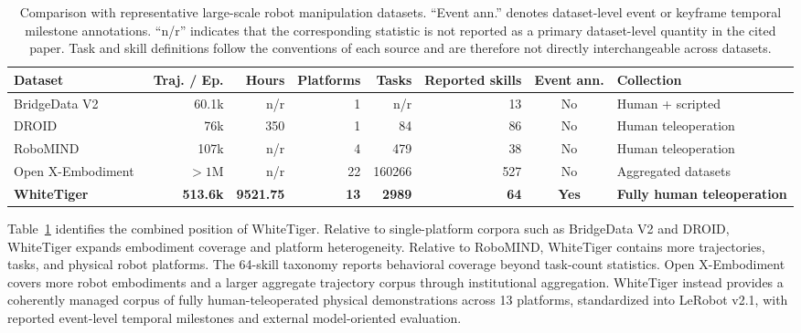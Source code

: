 \begin{table}[t]
\centering
\caption{Comparison with representative large-scale robot manipulation datasets. ``Event ann.'' denotes dataset-level event or keyframe temporal milestone annotations. ``n/r'' indicates that the corresponding statistic is not reported as a primary dataset-level quantity in the cited paper. Task and skill definitions follow the conventions of each source and are therefore not directly interchangeable across datasets.}
\label{tab:dataset-comparison}
\footnotesize
\setlength{\tabcolsep}{4pt}
\renewcommand{\arraystretch}{1.08}
\begin{adjustbox}{max width=\textwidth}
\begin{tabular}{lrrrrrcl}
\toprule
Dataset & Traj. / Ep. & Hours & Platforms & Tasks & Reported skills & Event ann. & Collection \\
\midrule
BridgeData V2~\cite{walke2023bridgedatav2} & 60.1k & n/r & 1 & n/r & 13 & No & Human + scripted \\
DROID~\cite{khazatsky2024droid} & 76k & 350 & 1 & 84 & 86 & No & Human teleoperation \\
RoboMIND~\cite{wu2024robomind} & 107k & n/r & 4 & 479 & 38 & No & Human teleoperation \\
Open X-Embodiment~\cite{oneill2023openx} & $>1$M & n/r & 22 & 160266 & 527 & No & Aggregated datasets \\
\textbf{WhiteTiger} & \textbf{513.6k} & \textbf{9521.75} & \textbf{13} & \textbf{2989} & \textbf{64} & \textbf{Yes} & \textbf{Fully human teleoperation} \\
\bottomrule
\end{tabular}
\end{adjustbox}
\end{table}

Table~\ref{tab:dataset-comparison} identifies the combined position of WhiteTiger. Relative to single-platform corpora such as BridgeData V2 and DROID, WhiteTiger expands embodiment coverage and platform heterogeneity. Relative to RoboMIND, WhiteTiger contains more trajectories, tasks, and physical robot platforms. The 64-skill taxonomy reports behavioral coverage beyond task-count statistics. Open X-Embodiment covers more robot embodiments and a larger aggregate trajectory corpus through institutional aggregation. WhiteTiger instead provides a coherently managed corpus of fully human-teleoperated physical demonstrations across 13 platforms, standardized into LeRobot v2.1, with reported event-level temporal milestones and external model-oriented evaluation.


